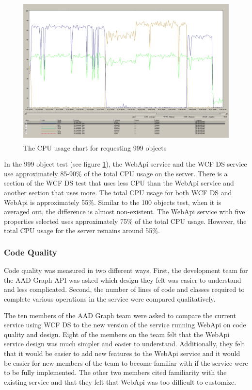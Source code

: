 \documentclass[se]{uw-wkrpt}
\begin{document}
\begin{figure}
  \centering
  \includegraphics[height=3in]{999CPU}
  \caption{The CPU usage chart for requesting 999 objects}
  \label{fig:999cpu}
\end{figure}

In the 999 object test (see figure \ref{fig:999cpu}), the WebApi service and the WCF DS service use approximately 85-90\% of the total CPU usage on the server. There is a section of the WCF DS test that uses less CPU than the WebApi service and another section that uses more. The total CPU usage for both WCF DS and WebApi is approximately 55\%. Similar to the 100 objects test, when it is averaged out, the difference is almost non-existent. The WebApi service with five properties selected uses approximately 75\% of the total CPU usage. However, the total CPU usage for the server remains around 55\%.

\subsubsection{Code Quality}

Code quality was measured in two different ways. First, the development team for the AAD Graph API was asked which design they felt was easier to understand and less complicated. Second, the number of lines of code and classes required to complete various operations in the service were compared qualitatively.

The ten members of the AAD Graph team were asked to compare the current service using WCF DS to the new version of the service running WebApi on code quality and design. Eight of the members on the team felt that the WebApi service design was much simpler and easier to understand. Additionally, they felt that it would be easier to add new features to the WebApi service and it would be easier for new members of the team to become familiar with if the service were to be fully implemented. The other two members cited familiarity with the existing service and that they felt that WebApi was too difficult to customize.
\end{document}
